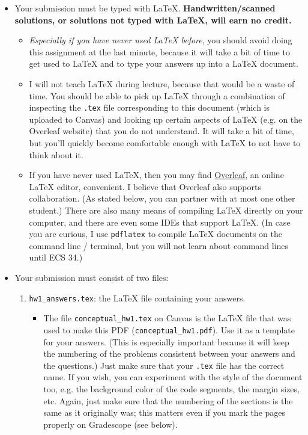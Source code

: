 \documentclass{article}
\begin{document}
\begin{itemize}[itemsep=0mm, parsep=0pt]
\item Your submission must be typed with LaTeX. \textbf{Handwritten/scanned solutions, or solutions not typed with LaTeX, will earn no credit.}
    \begin{itemize}[itemsep=0mm, parsep=0pt]
    \item \textit{Especially if you have never used LaTeX before}, you should avoid doing this assignment at the last minute, because it will take a bit of time to get used to LaTeX and to type your answers up into a LaTeX document.
    \item I will not teach LaTeX during lecture, because that would be a waste of time. You should be able to pick up LaTeX through a combination of inspecting the \lstinline{.tex} file corresponding to this document (which is uploaded to Canvas) and looking up certain aspects of LaTeX (e.g. on the Overleaf website) that you do not understand. It will take a bit of time, but you'll quickly become comfortable enough with LaTeX to not have to think about it.
    \item If you have never used LaTeX, then you may find \href{https://www.overleaf.com/}{Overleaf}, an online LaTeX editor, convenient. I believe that Overleaf also supports collaboration. (As stated below, you can partner with at most one other student.) There are also many means of compiling LaTeX directly on your computer, and there are even some IDEs that support LaTeX. (In case you are curious, I use \lstinline{pdflatex} to compile LaTeX documents on the command line / terminal, but you will not learn about command lines until ECS 34.)
    \end{itemize}
\item Your submission must consist of two files:
    \begin{enumerate}[itemsep=0mm, parsep=0pt]
    \item \lstinline{hw1_answers.tex}: the LaTeX file containing your answers.
        \begin{itemize}[itemsep=0mm, parsep=0pt]
        \item The file \lstinline{conceptual_hw1.tex} on Canvas is the LaTeX file that was used to make this PDF (\lstinline{conceptual_hw1.pdf}). Use it as a template for your answers. (This is especially important because it will keep the numbering of the problems consistent between your answers and the questions.) Just make sure that your \lstinline{.tex} file has the correct name. If you wish, you can experiment with the style of the document too, e.g. the background color of the code segments, the margin sizes, etc. Again, just make sure that the numbering of the sections is the same as it originally was; this matters even if you mark the pages properly on Gradescope (see below).

\end{itemize}
\end{enumerate}
\end{itemize}
\end{document}
